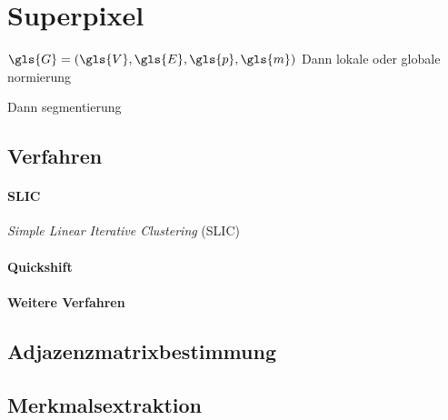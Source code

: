 \section{Superpixel}
\label{superpixel}

$\gls{G} = \left(\gls{V}, \gls{E}, \gls{p}, \gls{m}\right)$
Dann lokale oder globale normierung

Dann segmentierung

\subsection{Verfahren}
\label{superpixel_verfahren}

\paragraph{SLIC}
\label{slic}

\cite{slic}

\emph{Simple Linear Iterative Clustering} (SLIC)

\paragraph{Quickshift}
\label{quickshift}

\cite{quickshift}

\paragraph{Weitere Verfahren}
\label{weitere_superpixel_verfahren}

\cite{felzenszwalb}

\subsection{Adjazenzmatrixbestimmung}
\label{adjazenzmatrixbestimmung}

\subsection{Merkmalsextraktion}
\label{merkmalsextraktion}
